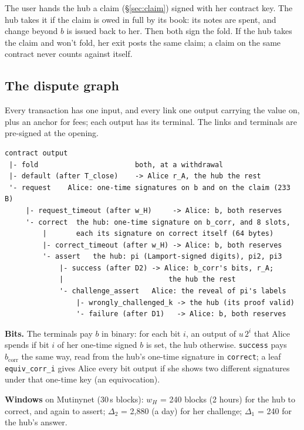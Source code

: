 \documentclass[11pt]{article}
\newcommand{\bcorr}{b_{\mathrm{corr}}}
\newcommand{\tx}[1]{\texttt{#1}}
\begin{document}
The user hands the hub a claim (\S\ref{sec:claim}) signed with her
contract key. The hub takes it if the claim is owed in full by its book:
its notes are spent, and change beyond $b$ is issued back to her. Then
both sign the fold. If the hub takes the claim and won't fold, her exit
posts the same claim; a claim on the same contract never counts against
itself.

\subsection{The dispute graph}\label{sec:graph}

Every transaction has one input, and every link one output carrying the
value on, plus an anchor for fees; each output has its terminal. The
links and terminals are pre-signed at the opening.

\begin{small}
\begin{verbatim}
contract output
 |- fold                       both, at a withdrawal
 |- default (after T_close)    -> Alice r_A, the hub the rest
 '- request    Alice: one-time signatures on b and on the claim (233 B)
     |- request_timeout (after w_H)     -> Alice: b, both reserves
     '- correct  the hub: one-time signature on b_corr, and 8 slots,
         |       each its signature on correct itself (64 bytes)
         |- correct_timeout (after w_H) -> Alice: b, both reserves
         '- assert   the hub: pi (Lamport-signed digits), pi2, pi3
             |- success (after D2) -> Alice: b_corr's bits, r_A;
             |                         the hub the rest
             '- challenge_assert   Alice: the reveal of pi's labels
                 |- wrongly_challenged_k -> the hub (its proof valid)
                 '- failure (after D1)   -> Alice: b, both reserves
\end{verbatim}
\end{small}

\textbf{Bits.} The terminals pay $b$ in binary: for each bit $i$, an
output of $u\,2^i$ that Alice spends if bit $i$ of her one-time signed
$b$ is set, the hub otherwise. \tx{success} pays $\bcorr$ the same way,
read from the hub's one-time signature in \tx{correct}; a leaf
\tx{equiv\_corr\_i} gives Alice every bit output if she shows two
different signatures under that one-time key (an equivocation).

\textbf{Windows} on Mutinynet (30\,s blocks): $w_H$ = 240 blocks (2
hours) for the hub to correct, and again to assert; $\Delta_2$ = 2,880
(a day) for her challenge; $\Delta_1$ = 240 for the hub's answer.
\end{document}
